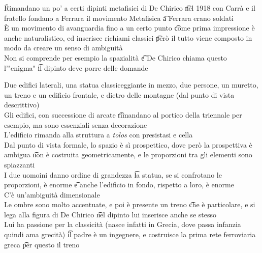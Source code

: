 \documentclass[12pt]{article}
\begin{document}
\v

Rimandano un po' a certi dipinti metafisici di De Chirico \t nel 1918 con Carrà e il fratello fondano a Ferrara il movimento Metafisica \t a Ferrara erano soldati \\
È un movimento di avanguardia fino a un certo punto \t come prima impressione è anche naturalistico, ed inserisce richiami classici \t però il tutto viene composto in modo da creare un senso di ambiguità \\
Non si comprende per esempio la spazialità \t e De Chirico chiama questo l'"enigma" \t il dipinto deve porre delle domande

Due edifici laterali, una statua classiceggiante in mezzo, due persone, un muretto, un treno e un edificio frontale, e dietro delle montagne (dal punto di vista descrittivo) \\
Gli edifici, con successione di arcate \t rimandano al portico della triennale per esempio, ma sono essenziali senza decorazione \\
L'edificio rimanda alla struttura a \textit{tolos} con presistasi e cella \\
Dal punto di vista formale, lo spazio è sì prospettico, dove però la prospettiva è ambigua \t non è costruita geometricamente, e le proporzioni tra gli elementi sono spiazzanti \\
I due uomoini danno ordine di grandezza \t la statua, se si confrotano le proporzioni, è enorme \t e anche l'edificio in fondo, rispetto a loro, è enorme \\
C'è un'ambiguità dimensionale \\
Le ombre sono molto accentuate, e poi è presente un treno \t che è particolare, e si lega alla figura di De Chirico \t nel dipinto lui inserisce anche se stesso \\
Lui ha passione per la classicità (nasce infatti in Grecia, dove passa infanzia quindi ama grecità) \t il padre è un ingegnere, e costruisce la prima rete ferroviaria greca \t per questo il treno
\end{document}
